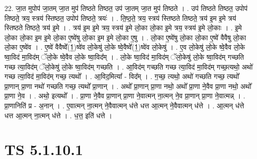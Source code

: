 \documentclass[17pt]{extarticle}
\begin{document}
22. जा॒त मुपोप॑ जा॒तम् जा॒त मुप॑ तिष्ठते तिष्ठत॒ उप॑ जा॒तम् जा॒त मुप॑ तिष्ठते । . उप॑ तिष्ठते तिष्ठत॒ उपोप॑ तिष्ठते॒ त्रय॒ स्त्रय॑ स्तिष्ठत॒ उपोप॑ तिष्ठते॒ त्रयः॑ । . ति॒ष्ठ॒ते॒ त्रय॒ स्त्रय॑ स्तिष्ठते तिष्ठते॒ त्रय॑ इ॒म इ॒मे त्रय॑ स्तिष्ठते तिष्ठते॒ त्रय॑ इ॒मे । . त्रय॑ इ॒म इ॒मे त्रय॒ स्त्रय॑ इ॒मे लो॒का लो॒का इ॒मे त्रय॒ स्त्रय॑ इ॒मे लो॒काः । . इ॒मे लो॒का लो॒का इ॒म इ॒मे लो॒का ए॒ष्वे॑षु लो॒का इ॒म इ॒मे लो॒का ए॒षु । . लो॒का ए॒ष्वे॑षु लो॒का लो॒का ए॒ष्वे॑ वैवैषु लो॒का लो॒का ए॒ष्वे॑व । . ए॒ष्वे॑ वैवैष्वे᳚(1॒)ष्वे॑व लो॒केषु॑ लो॒के ष्वे॒वैष्वे᳚(1॒)ष्वे॑व लो॒केषु॑ । . ए॒व लो॒केषु॑ लो॒के ष्वे॒वैव लो॒के ष्वा॒विद॑ मा॒विद॑म् ॅलो॒के ष्वे॒वैव लो॒के ष्वा॒विद᳚म् । . लो॒के ष्वा॒विद॑ मा॒विद॑म् ॅलो॒केषु॑ लो॒के ष्वा॒विद॑म् गच्छति गच्छ त्या॒विद॑म् ॅलो॒केषु॑ लो॒के ष्वा॒विद॑म् गच्छति । . आ॒विद॑म् गच्छति गच्छ त्या॒विद॑ मा॒विद॑म् गच्छ॒त्यथो॒ अथो॑ गच्छ त्या॒विद॑ मा॒विद॑म् गच्छ॒ त्यथो᳚ । . आ॒विद॒मित्या᳚ - विद᳚म् । . ग॒च्छ॒ त्यथो॒ अथो॑ गच्छति गच्छ॒ त्यथो᳚ प्रा॒णान् प्रा॒णा नथो॑ गच्छति गच्छ॒ त्यथो᳚ प्रा॒णान् । . अथो᳚ प्रा॒णान् प्रा॒णा नथो॒ अथो᳚ प्रा॒णा ने॒वैव प्रा॒णा नथो॒ अथो᳚ प्रा॒णा ने॒व । . अथो॒ इत्यथो᳚ । . प्रा॒णा ने॒वैव प्रा॒णान् प्रा॒णा ने॒वात्मन् ना॒त्मन् ने॒व प्रा॒णान् प्रा॒णा ने॒वात्मन्न् । . प्रा॒णानिति॑ प्र - अ॒नान् । . ए॒वात्मन् ना॒त्मन् ने॒वैवात्मन् ध॑त्ते धत्त आ॒त्मन् ने॒वैवात्मन् ध॑त्ते । . आ॒त्मन् ध॑त्ते धत्त आ॒त्मन् ना॒त्मन् ध॑त्ते । . ध॒त्त॒ इति॑ धत्ते । \newline
\pagebreak
{}

\section{ TS 5.1.10.1 }
\end{document}
